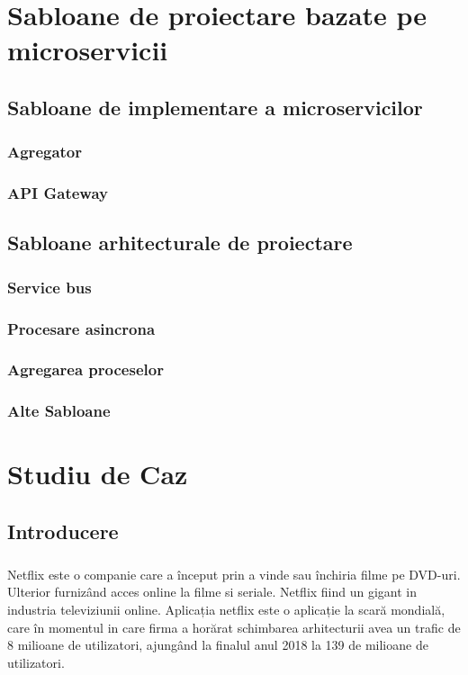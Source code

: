 \documentclass[12pt]{report}
\begin{document}
\chapter{Sabloane de proiectare bazate pe microservicii}
	\section{Sabloane de implementare a microservicilor}
		\subsection{Agregator}
		\subsection{API Gateway}
	\section{Sabloane arhitecturale de proiectare}
		\subsection{Service bus}
		\subsection{Procesare asincrona}
		\subsection{Agregarea proceselor}
		\subsection{Alte Sabloane}
\chapter{Studiu de Caz}
	\section{Introducere}
	\paragraph{}Netflix este o companie care a început prin a vinde sau închiria filme pe DVD-uri. Ulterior furnizând acces online la filme si seriale. Netflix fiind un gigant in industria televiziunii online. Aplicația netflix este o aplicație la scară mondială, care în momentul in care firma a horărat schimbarea arhitecturii avea un trafic de 8 milioane de utilizatori, ajungând la finalul anul 2018 la 139 de milioane de utilizatori.	
\end{document}
